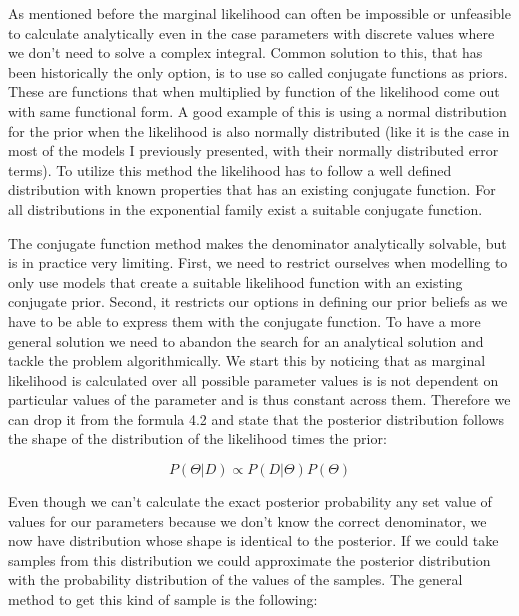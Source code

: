 \documentclass[12pt,a4paper,leqno]{report}
\theoremstyle{plain}
\theoremstyle{definition}
\theoremstyle{remark}
\begin{document}
As mentioned before the marginal likelihood can often be impossible or unfeasible to
calculate analytically even in the case parameters with discrete values where we don't
need to solve a complex integral.
Common solution to this, that has been historically the only option, is to use so called conjugate functions as priors. These are
functions that when multiplied by function of the likelihood come out
with same functional form. A good example of this is using a normal distribution
for the prior when the likelihood is also normally distributed (like it is the case in most
of the models I previously presented, with their normally distributed error terms).
To utilize this method the likelihood has to follow a well defined distribution
with known properties that has an existing conjugate function. For all distributions in
the exponential family exist a suitable conjugate function.

The conjugate function method makes the denominator analytically solvable, but is in practice very limiting.
First, we need to restrict ourselves when modelling to only use models that create a suitable likelihood function with an existing conjugate prior.
Second, it restricts our options in defining our prior beliefs as we have to be able to express them with the conjugate function.
To have a more general solution we need to abandon the search for an analytical
solution and tackle the problem algorithmically. We start this by noticing that as marginal likelihood
is calculated over all possible parameter values
is is not dependent on particular values of the parameter and is thus
constant across them. Therefore we can drop it from the formula 4.2 and state that the posterior
distribution follows the shape of the distribution of the likelihood times the prior:

\begin{def}\label{bayespropto}
    \begin{equation}
        P(\Theta|D) \propto P(D|\Theta)P(\Theta)
    \end{equation}
\end{def}

Even though we can't calculate the exact posterior probability any set value of values for
our parameters because we don't know the correct denominator, we now have distribution whose shape
is identical to the posterior. If we could take samples from this distribution we could
approximate the posterior distribution with the probability distribution of the values of the samples.
The general method to get this kind of sample is the following:
\end{document}
